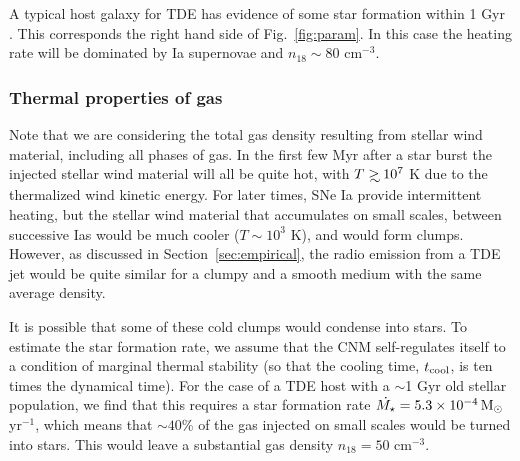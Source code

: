 \documentclass[usenatbib,fleqn]{mnras}
\newcommand\gsim{\mathrel{\rlap{\lower4pt\hbox{\hskip1pt$\sim$}}
    \raise1pt\hbox{$>$}}}
\newcommand{\Msun}{{\rm M_\odot}}
\begin{document}
A typical host galaxy for TDE has evidence of some star formation
within 1 Gyr \citep{French+2016}. This corresponds the right hand side
of Fig.~\ref{fig:param}. In this case the heating rate will be
dominated by Ia supernovae and $n_{18}\sim 80$ cm$^{-3}$.

\subsubsection{Thermal properties of gas}

Note that we are considering the total gas density resulting from
stellar wind material, including all phases of gas. In the first few
Myr after a star burst the injected stellar wind material will all be
quite hot, with $T\gsim 10^{7}$ K due to the thermalized wind kinetic
energy. For later times, SNe Ia provide intermittent heating, but the
stellar wind material that accumulates on small scales, between
successive Ias would be much cooler ($T\sim 10^{3}$ K), and would form
clumps. However, as discussed in Section~\ref{sec:empirical}, the
radio emission from a TDE jet would be quite similar for a clumpy and
a smooth medium with the same average density.

It is possible that some of these cold clumps would condense into
stars. To estimate the star formation rate, we assume that the CNM
self-regulates itself to a condition of marginal thermal
stability (so that the cooling time, $t_{\rm cool}$, is ten times the
dynamical time). For the case of a TDE host with a $\sim$1 Gyr old stellar
population, we find that this requires a star formation rate $\dot{M_\star}
=5.3 \times 10^{-4} \,\Msun$ yr$^{-1}$, which means that $\sim 40$\% of
the gas injected on small scales would be turned into stars. This
would leave a substantial gas density $n_{18}=50$ cm$^{-3}$.   
\end{document}
